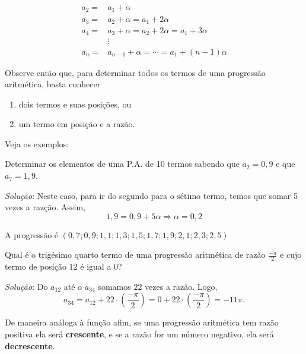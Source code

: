 \begin{align*}
a_2=&a_1+\alpha\\
a_3=&a_2+\alpha=a_1+2\alpha\\
a_4=&a_3+\alpha=a_2+2\alpha=a_1+3\alpha\\
&\vdots\\
a_n=&a_{n-1}+\alpha=\cdots=a_1+(n-1)\alpha
\end{align*}

Observe então que, para determinar todos os termos de uma progressão aritmética, basta conhecer
\begin{enumerate}
\item dois termos e suas posições, ou
\item um termo em posição e a razão.
\end{enumerate}
Veja os exemplos:

\begin{example}{}
Determinar os elementos de uma P.A. de 10 termos sabendo que $a_2=0{,}9$ e que $a_7=1{,}9$.

\textit{Solução}: Neste caso, para ir do segundo para o sétimo termo, temos que somar 5 vezes a razção. Assim,
\begin{equation*}
1{,}9=0{,}9+5\alpha\Rightarrow\alpha=0{,}2
\end{equation*}

A progressão é $(0{,}7;0{,}9;1{,}1;1{,}3;1{,}5;1{,}7;1{,}9;2{,}1;2{,}3;2{,}5)$
\end{example}
\begin{example}{}
Qual é o trigésimo quarto termo de uma progressão aritmética de razão $\displaystyle\frac{-\pi}{2}$ e cujo termo de posição $12$ é igual a $0$?

\textit{Solução}: Do $a_12$ até o $a_34$ somamos $22$ vezes a razão. Logo,
\begin{equation*}
a_{34}=a_12+22\cdot(\frac{-\pi}{2})=0+22\cdot(\frac{-\pi}{2})=-11\pi.
\end{equation*}
\end{example}

\begin{observation}{}
De maneira análoga à função afim, se uma progressão aritmética tem razão positiva ela será \textbf{crescente}, e se a razão for um número negativo, ela será \textbf{decrescente}.
\end{observation}

